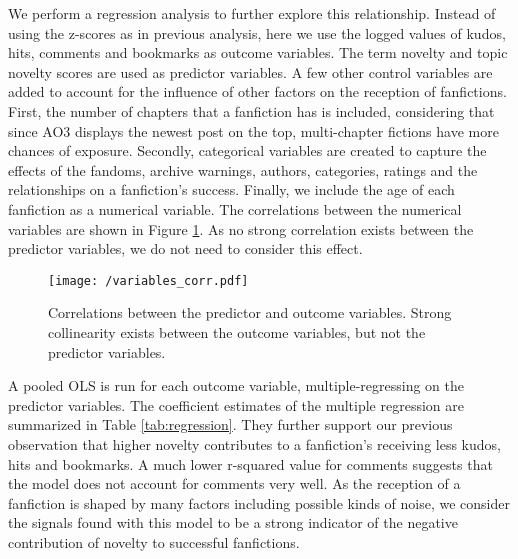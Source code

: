 \documentclass[a4paper]{article}
\begin{document}
We perform a regression analysis to further explore this relationship. Instead of using the z-scores as in previous analysis, here we use the logged values of kudos, hits, comments and bookmarks as outcome variables. The term novelty and topic novelty scores are used as predictor variables. A few other control variables are added to account for the influence of other factors on the reception of fanfictions. First, the number of chapters that a fanfiction has is included, considering that since AO3 displays the newest post on the top, multi-chapter fictions have more chances of exposure. Secondly, categorical variables are created to capture the effects of the fandoms, archive warnings, authors, categories, ratings and the relationships on a fanfiction's success. Finally, we include the age of each fanfiction as a numerical variable. The correlations between the numerical variables are shown in Figure \ref{fig:corr}. As no strong correlation exists between the predictor variables, we do not need to consider this effect.

\begin{figure}
    \centering
          \texttt{[image: /variables\_corr.pdf]}
        \caption{Correlations between the predictor and outcome variables. Strong collinearity exists between the outcome variables, but not the predictor variables. }
        \label{fig:corr}
\end{figure}

A pooled OLS is run for each outcome variable, multiple-regressing on the predictor variables. The coefficient estimates of the multiple regression are summarized in Table \ref{tab:regression}. They further support our previous observation that higher novelty contributes to a fanfiction's receiving less kudos, hits and bookmarks. A much lower r-squared value for comments suggests that the model does not account for comments very well. As the reception of a fanfiction is shaped by many factors including possible kinds of noise, we consider the signals found with this model to be a strong indicator of the negative contribution of novelty to successful fanfictions.
\end{document}
